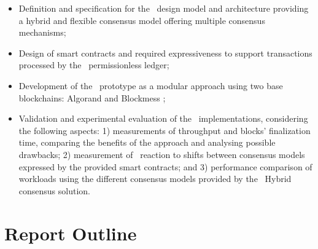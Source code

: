 \begin{itemize}
    \item Definition and specification for the \mysystem~design model and architecture providing a hybrid and flexible consensus model offering multiple consensus mechanisms;
    \item Design of smart contracts and required expressiveness to support transactions processed by the \mysystem~permissionless ledger;
    \item Development of the \mysystem~prototype as a modular approach using two base blockchains: Algorand \cite{algorand} and Blockmess \cite{blockmess};
    \item Validation and experimental evaluation of the \mysystem~implementations, considering the following aspects: 1) measurements of throughput and blocks' finalization time, comparing the benefits of the approach and analysing possible drawbacks; 2) measurement of \mysystem~reaction to shifts between consensus models expressed by the provided smart contracts; and 3) performance comparison of workloads using the different consensus models provided by the \mysystem~Hybrid consensus solution.
\end{itemize}

\section{Report Outline}
\label{sub:intro-outline}

